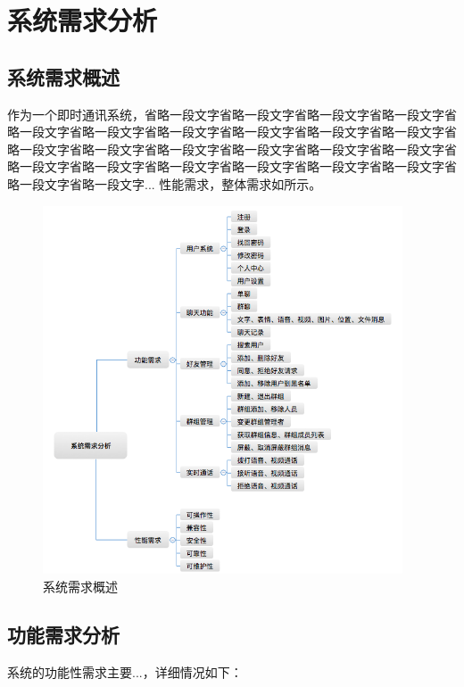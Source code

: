 \section{系统需求分析}
	\subsection{系统需求概述}
  
	作为一个即时通讯系统，省略一段文字省略一段文字省略一段文字省略一段文字省略一段文字省略一段文字省略一段文字省略一段文字省略一段文字省略一段文字省略一段文字省略一段文字省略一段文字省略一段文字省略一段文字省略一段文字省略一段文字省略一段文字省略一段文字省略一段文字省略一段文字省略一段文字省略一段文字省略一段文字... 性能需求，整体需求如所示。
	
     
	\begin{figure}[H]
		\centering
		\includegraphics[width=0.95\textwidth]{images/demand_analysis}
		\caption{系统需求概述}
		\label{demand analysis}
	\end{figure}
     
     
	\subsection{功能需求分析}
  
	系统的功能性需求主要...，详细情况如下：
  
